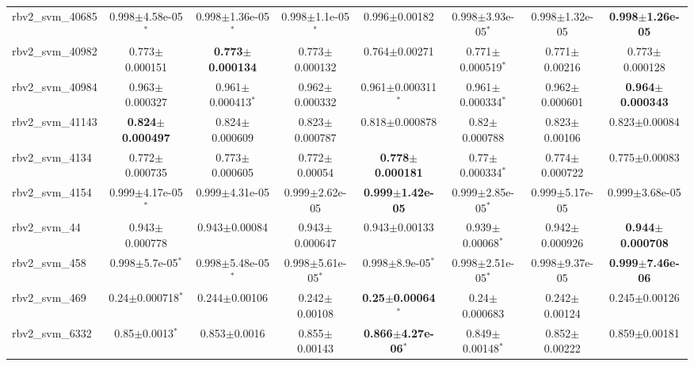 \begin{table}[t]
\begin{center}
\begin{tabular}{lccccccc}
rbv2\_svm\_40685 & 0.998$\pm$4.58e-05$^{*}$ & 0.998$\pm$1.36e-05$^{*}$ & 0.998$\pm$1.1e-05$^{*}$ & 0.996$\pm$0.00182 & 0.998$\pm$3.93e-05$^{*}$ & 0.998$\pm$1.32e-05 & \textbf{0.998$\pm$1.26e-05} \\
rbv2\_svm\_40982 & 0.773$\pm$0.000151 & \textbf{0.773$\pm$0.000134} & 0.773$\pm$0.000132 & 0.764$\pm$0.00271 & 0.771$\pm$0.000519$^{*}$ & 0.771$\pm$0.00216 & 0.773$\pm$0.000128 \\
rbv2\_svm\_40984 & 0.963$\pm$0.000327 & 0.961$\pm$0.000413$^{*}$ & 0.962$\pm$0.000332 & 0.961$\pm$0.000311$^{*}$ & 0.961$\pm$0.000334$^{*}$ & 0.962$\pm$0.000601 & \textbf{0.964$\pm$0.000343} \\
rbv2\_svm\_41143 & \textbf{0.824$\pm$0.000497} & 0.824$\pm$0.000609 & 0.823$\pm$0.000787 & 0.818$\pm$0.000878 & 0.82$\pm$0.000788 & 0.823$\pm$0.00106 & 0.823$\pm$0.00084 \\
rbv2\_svm\_4134 & 0.772$\pm$0.000735 & 0.773$\pm$0.000605 & 0.772$\pm$0.00054 & \textbf{0.778$\pm$0.000181} & 0.77$\pm$0.000334$^{*}$ & 0.774$\pm$0.000722 & 0.775$\pm$0.00083 \\
rbv2\_svm\_4154 & 0.999$\pm$4.17e-05$^{*}$ & 0.999$\pm$4.31e-05 & 0.999$\pm$2.62e-05 & \textbf{0.999$\pm$1.42e-05} & 0.999$\pm$2.85e-05$^{*}$ & 0.999$\pm$5.17e-05 & 0.999$\pm$3.68e-05 \\
rbv2\_svm\_44 & 0.943$\pm$0.000778 & 0.943$\pm$0.00084 & 0.943$\pm$0.000647 & 0.943$\pm$0.00133 & 0.939$\pm$0.00068$^{*}$ & 0.942$\pm$0.000926 & \textbf{0.944$\pm$0.000708} \\
rbv2\_svm\_458 & 0.998$\pm$5.7e-05$^{*}$ & 0.998$\pm$5.48e-05$^{*}$ & 0.998$\pm$5.61e-05$^{*}$ & 0.998$\pm$8.9e-05$^{*}$ & 0.998$\pm$2.51e-05$^{*}$ & 0.998$\pm$9.37e-05 & \textbf{0.999$\pm$7.46e-06} \\
rbv2\_svm\_469 & 0.24$\pm$0.000718$^{*}$ & 0.244$\pm$0.00106 & 0.242$\pm$0.00108 & \textbf{0.25$\pm$0.00064}$^{*}$ & 0.24$\pm$0.000683 & 0.242$\pm$0.00124 & 0.245$\pm$0.00126 \\
rbv2\_svm\_6332 & 0.85$\pm$0.0013$^{*}$ & 0.853$\pm$0.0016 & 0.855$\pm$0.00143 & \textbf{0.866$\pm$4.27e-06}$^{*}$ & 0.849$\pm$0.00148$^{*}$ & 0.852$\pm$0.00222 & 0.859$\pm$0.00181 \\
\hline
\end{tabular}
\end{center}
\end{table}